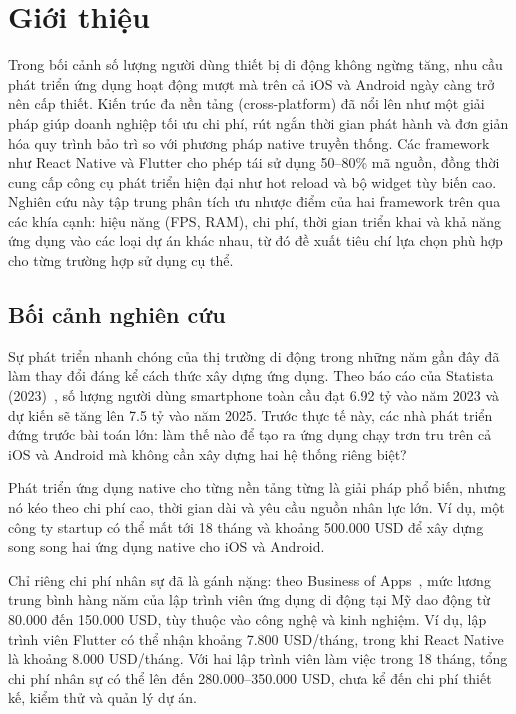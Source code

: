 \section{Giới thiệu}
  
    \hspace*{0.8cm}Trong bối cảnh số lượng người dùng thiết bị di động không ngừng tăng, nhu cầu phát triển ứng dụng hoạt động mượt mà trên cả iOS và Android ngày càng trở nên cấp thiết. Kiến trúc đa nền tảng (cross-platform) đã nổi lên như một giải pháp giúp doanh nghiệp tối ưu chi phí, rút ngắn thời gian phát hành và đơn giản hóa quy trình bảo trì so với phương pháp native truyền thống. Các framework như React Native và Flutter cho phép tái sử dụng 50--80\% mã nguồn, đồng thời cung cấp công cụ phát triển hiện đại như hot reload và bộ widget tùy biến cao. Nghiên cứu này tập trung phân tích ưu nhược điểm của hai framework trên qua các khía cạnh: hiệu năng (FPS, RAM), chi phí, thời gian triển khai và khả năng ứng dụng vào các loại dự án khác nhau, từ đó đề xuất tiêu chí lựa chọn phù hợp cho từng trường hợp sử dụng cụ thể.  
\vspace{0.5em}

\subsection{Bối cảnh nghiên cứu}
\renewcommand{\labelitemi}{--}    

    \hspace*{0.8cm}Sự phát triển nhanh chóng của thị trường di động trong những năm gần đây đã làm thay đổi đáng kể cách thức xây dựng ứng dụng. Theo báo cáo của Statista (2023)~\cite{statista2023}, số lượng người dùng smartphone toàn cầu đạt 6.92 tỷ vào năm 2023 và dự kiến sẽ tăng lên 7.5 tỷ vào năm 2025. Trước thực tế này, các nhà phát triển đứng trước bài toán lớn: làm thế nào để tạo ra ứng dụng chạy trơn tru trên cả iOS và Android mà không cần xây dựng hai hệ thống riêng biệt?
\vspace{0.5em}


    \hspace*{0.8cm}Phát triển ứng dụng native cho từng nền tảng từng là giải pháp phổ biến, nhưng nó kéo theo chi phí cao, thời gian dài và yêu cầu nguồn nhân lực lớn. Ví dụ, một công ty startup có thể mất tới 18 tháng và khoảng 500.000 USD để xây dựng song song hai ứng dụng native cho iOS và Android.
\vspace{0.5em}


    \hspace*{0.8cm}Chỉ riêng chi phí nhân sự đã là gánh nặng: theo Business of Apps~\cite{businessofapps2025}, mức lương trung bình hàng năm của lập trình viên ứng dụng di động tại Mỹ dao động từ 80.000 đến 150.000 USD, tùy thuộc vào công nghệ và kinh nghiệm. Ví dụ, lập trình viên Flutter có thể nhận khoảng 7.800 USD/tháng, trong khi React Native là khoảng 8.000 USD/tháng. Với hai lập trình viên làm việc trong 18 tháng, tổng chi phí nhân sự có thể lên đến 280.000--350.000 USD, chưa kể đến chi phí thiết kế, kiểm thử và quản lý dự án.
\vspace{0.5em}



